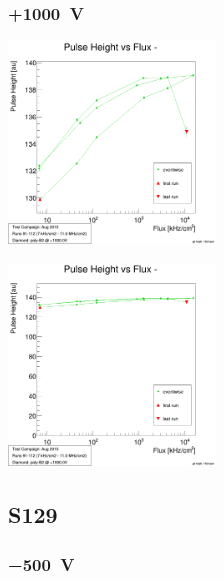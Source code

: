 \documentclass[9pt]{beamer}
\begin{document}
\begin{frame}
	\frametitle{+\SI{1000}{V}}
	\begin{minipage}{5.5cm}
		\centering
		\includegraphics[width=5.5cm]{PhB2Pos}
	\end{minipage}
	\vspace*{2pt}
	\begin{minipage}{5.5cm}
		\centering
		\includegraphics[width=5.5cm]{PhB2PosZero}
	\end{minipage}
\end{frame}
\subsection{S129}
\begin{frame}
	\frametitle{\SI{-500}{V}}
	\begin{minipage}{5.5cm}
		\centering
	\end{minipage}
	\vspace*{2pt}
	\begin{minipage}{5.5cm}
		\centering
	\end{minipage}
\end{frame}
\end{document}
